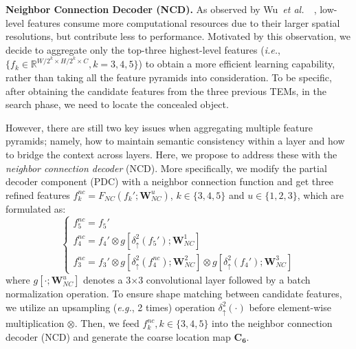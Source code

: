 \documentclass[10pt,journal,compsoc]{IEEEtran}
\def\ie{\emph{i.e.}}
\def\eg{\emph{e.g.}}
\def\etal{{\em et al.~}}
\newcommand{\myPara}[1]{\vspace{6pt}\noindent\textbf{#1}\qquad }
\newcommand{\figref}[1]{Fig.~\ref{#1}}
\begin{document}
\myPara{Neighbor Connection Decoder (NCD).}
%
As observed by Wu~\etal~\cite{wu2019cascaded}, 
low-level features consume more computational resources due to 
their larger spatial resolutions, but contribute less to performance.
%
Motivated by this observation, 
we decide to aggregate only the top-three highest-level features 
(\ie, $\{f_k \in \mathbb{R}^{W/2^{k} \times H/2^{k} \times C}, k = 3,4,5 \}$) 
to obtain a more efficient learning capability, 
rather than taking all the feature pyramids into consideration.
%
To be specific, after obtaining the candidate features from the three previous 
TEMs, in the search phase, we need to locate the concealed object.

However, there are still two key issues when aggregating multiple 
feature pyramids; namely, how to maintain semantic consistency within a layer 
and how to bridge the context across layers.
%
Here, we propose to address these with the \textit{neighbor connection decoder} (NCD).
%
More specifically, we modify the partial decoder component (PDC)
\cite{wu2019cascaded} with a neighbor connection function and get three refined 
features $f_{k}^{nc}= F_{NC}(f_{k}'; \mathbf{W}_{NC}^{u})$, $k \in \{ 3,4,5 \}$ 
and $u \in \{ 1,2,3 \}$, which are formulated as:
%
\begin{equation}
\left\{
\begin{array}{l}
f_{5}^{nc}=f_{5}'\\
f_{4}^{nc}=f_{4}' \otimes g[\delta^{2}_{\uparrow}(f_{5}'); 
\mathbf{W}_{NC}^{1}]\\
f_{3}^{nc}=f_{3}' \otimes g[\delta^{2}_{\uparrow}(f_{4}^{nc}); 
\mathbf{W}_{NC}^{2}] \otimes g[\delta^{2}_{\uparrow}(f_{4}'); 
\mathbf{W}_{NC}^{3}]
\end{array} \right.
\end{equation}
%
where $g[\cdot;\mathbf{W}_{NC}^{u}]$ denotes a 3$\times$3 convolutional layer 
followed by a batch normalization operation. 
%
To ensure shape matching between candidate features, 
we utilize an upsampling (\eg, 2 times) operation 
$\delta^{2}_{\uparrow}(\cdot)$ before element-wise multiplication $\otimes$.
%
Then, we feed $f_{k}^{nc}, k \in \{ 3,4,5 \}$ into the neighbor connection 
decoder (NCD) and generate the coarse location map $\mathbf{C_6}$. 
%
%
\end{document}
